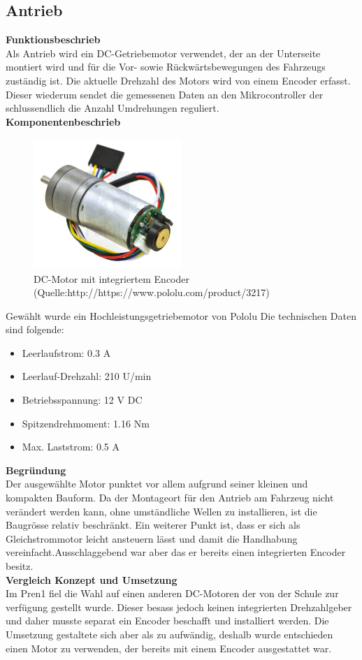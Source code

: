 \subsection{Antrieb}
\textbf{Funktionsbeschrieb}\\[0.2cm]
Als Antrieb wird ein DC-Getriebemotor verwendet, der an der Unterseite montiert wird und für die Vor- sowie Rückwärtsbewegungen des Fahrzeugs zuständig ist.
Die aktuelle Drehzahl des Motors wird von einem Encoder erfasst. Dieser wiederum sendet die gemessenen Daten an den Mikrocontroller der schlussendlich die Anzahl Umdrehungen reguliert.\\[0.2cm]
\textbf{Komponentenbeschrieb}
\begin{figure}[H]
\centering
\includegraphics[width=0.5\textwidth]{03_Loesungskonzept/pictures/Antrieb_Encoder.jpg}
\caption{DC-Motor mit integriertem Encoder (Quelle:http://https://www.pololu.com/product/3217)}	
\end{figure}
Gewählt wurde ein Hochleistungsgetriebemotor von Pololu
Die technischen Daten sind folgende:
\begin{itemize}
\item Leerlaufstrom: 0.3 A
\item Leerlauf-Drehzahl: 210 U/min
\item Betriebsspannung: 12 V DC
\item Spitzendrehmoment: 1.16 Nm
\item Max. Laststrom: 0.5 A
\end{itemize}
\textbf{Begründung}\\[0.2cm]
Der ausgewählte Motor punktet vor allem aufgrund seiner kleinen und kompakten Bauform. Da der Montageort für den Antrieb am Fahrzeug nicht verändert werden kann, ohne umständliche Wellen zu installieren, ist die Baugrösse relativ beschränkt.
Ein weiterer Punkt ist, dass er sich als Gleichstrommotor leicht ansteuern lässt und damit die Handhabung vereinfacht.Ausschlaggebend war aber das er bereits einen integrierten Encoder besitz.\\[0.2cm]
\textbf{Vergleich Konzept und Umsetzung}\\[0.2cm]
Im Pren1 fiel die Wahl auf einen anderen DC-Motoren der von der Schule zur verfügung gestellt wurde. Dieser besass jedoch keinen integrierten Drehzahlgeber und daher musste separat ein Encoder beschafft und installiert werden.
Die Umsetzung gestaltete sich aber als zu aufwändig, deshalb wurde entschieden einen Motor zu verwenden, der bereits mit einem Encoder ausgestattet war.
